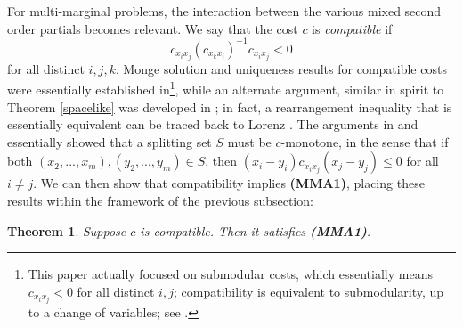 \documentclass[letter,10pt]{article}
\theoremstyle{dotless}
\begin{document}
For multi-marginal problems, the interaction between the various mixed second order partials becomes relevant.  We say that the cost $c$ is \textit{compatible} if  
\begin{equation*}
c_{x_ix_j} (c_{x_k x_i} )^{-1}c_{x_ix_j} <0
\end{equation*}
for all distinct $i,j,k$.  Monge solution and uniqueness results for compatible costs were essentially established in\cite{C}\footnote{This paper actually focused on submodular costs, which essentially means $ c_{x_ix_j} <0$ for all distinct $i,j$; compatibility is equivalent to submodularity, up to a change of variables; see \cite{P4}.}, while an alternate argument, similar in spirit to Theorem \ref{spacelike} was developed in \cite{P4}; in fact, a rearrangement inequality that is essentially equivalent can be traced back to Lorenz \cite{lorentz}.  The arguments in \cite{C} and \cite{P4} essentially showed that a splitting set $S$ must be $c$-monotone, in the sense that if both $(x_2,...,x_m), (y_2,...,y_m) \in S$, then $(x_i-y_i)c_{x_ix_j} (x_j-y_j) \leq 0$ for all $i \neq j$.  We can then show that compatibility implies \textbf{(MMA1)}, placing these results within the framework of the previous subsection:
\newtheorem{onedmonge}{Theorem}[subsection]
\begin{onedmonge}\label{onedmonge}
Suppose $c$ is compatible.  Then it satisfies \textbf{(MMA1)}.
\end{onedmonge}
\end{document}
